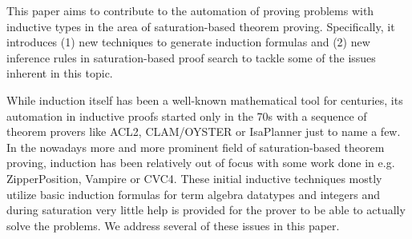 
This paper aims to contribute to the automation of proving problems with inductive types in the area of saturation-based theorem proving. Specifically, it introduces (1) new techniques to generate induction formulas and (2) new inference rules in saturation-based proof search to tackle some of the issues inherent in this topic.

While induction itself has been a well-known mathematical tool for centuries, its automation in inductive proofs started only in the 70s with a sequence of theorem provers like ACL2, CLAM/OYSTER or IsaPlanner just to name a few. In the nowadays more and more prominent field of saturation-based theorem proving, induction has been relatively out of focus with some work done in e.g. ZipperPosition, Vampire or CVC4. These initial inductive techniques mostly utilize basic induction formulas for term algebra datatypes and integers and during saturation very little help is provided for the prover to be able to actually solve the problems. We address several of these issues in this paper.

